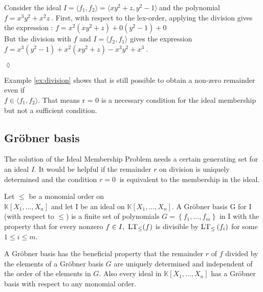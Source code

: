 \begin{env_example}\normalfont
\label{ex:division}
Consider the ideal $I = \langle f_{1},f_{2} \rangle = \langle xy^{2}+z,y^{2}-1 \rangle~$and the polynomial $f = x^{3}y^{2}+x^{2}z~$.
First, with respect to the lex-order, applying the division gives the expression : $f = x^{2}(xy^{2}+z) + 0(y^{2}-1) + 0$ \\
But the division with $f$ and $I = \langle f_{2},f_{1} \rangle$ gives the expression \\ $f = x^{3}(y^{2}-1) + x^{2}(xy^{2}+z) -x^{3}y^{2}+x^{3}~$.
\begin{flushright}
$\lozenge$
\end{flushright}
\end{env_example}



Example \ref{ex:division} shows that is still possible to obtain a non-zero remainder even if \\$f \in \langle f_{1},f_{2} \rangle $. That means r = 0 is a  necessary condition for the ideal membership but not a sufficient condition.
\subsection{Gröbner basis}
\label{subsec:Groebner}

The solution of the Ideal Membership Problem needs a certain generating set for an ideal $I$. It would be helpful if the remainder $r$ on division is uniquely determined and the condition $ r = 0~$ is equivalent to the membership in the ideal.



\begin{env_definition}
\cite{KHZ}
Let $\leq$ be a monomial order on \\ $\mathbb{K}\left[X_{1}, \dots, X_{n}\right]$ and let I be an ideal on $ \mathbb{K}\left[X_{1}, \dots, X_{n}\right]  $. A Gröbner basis G for I (with respect to $\leq$) is a finite set of polynomials $ G = \left\lbrace f_{1}, \ldots , f_{m} \right\rbrace $ in I with the property that for every nonzero $ f \in I ,~\textsc{LT}_{\leq}(f) $ is divisible by $\textsc{LT}_{\leq}\left( f_{i}\right) $ for some $ 1 \leq i \leq m $.

\end{env_definition}

A Gröbner basis has the beneficial property that the remainder $r$ of $f$ divided by the elements of a Gröbner basis $G$ are uniquely determined and independent of the order of the elements in $G$.
Also every ideal in $\mathbb{K}\left[X_{1}, \dots, X_{n}\right]$ has a Gröbner basis with respect to any monomial order\cite{KHZ}.\\ 


